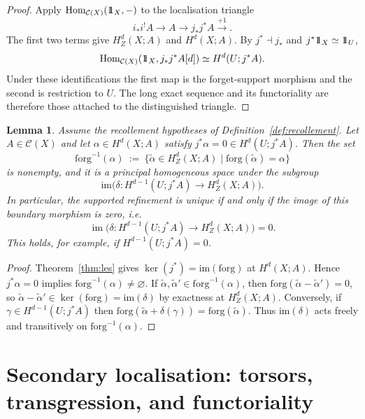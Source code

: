 \documentclass[10pt,a4paper,dvipsnames,x11names]{amsart}
\newcommand{\one}{1\hskip-3.5pt1}
\newcommand{\C}{\mathcal C}
\newcommand{\Hom}{\mathrm{Hom}}
\newcommand{\forg}{\mathrm{forg}}
\numberwithin{equation}{section}
\theoremstyle{plain}
\newtheorem{lemma}[lemma]{Lemma}
\theoremstyle{definition}
\theoremstyle{remark}
\begin{document}
\begin{proof}
Apply $\Hom_{\C(X)}(\one_X,-)$ to the localisation triangle
\[
i_*i^!A\longrightarrow A\longrightarrow j_*j^*A\xrightarrow{+1}.
\]
The first two terms give $H_Z^d(X;A)$ and $H^d(X;A)$.  By $j^*\dashv j_*$ and $j^*\one_X\simeq\one_U$,
\[
\Hom_{\C(X)}(\one_X,j_*j^*A[d])
\simeq
H^d(U;j^*A).
\]
Under these identifications the first map is the forget-support morphism and the second is restriction to $U$.  The long exact sequence and its functoriality are therefore those attached to the distinguished triangle.
\end{proof}

\begin{lemma} \label{lem:supported-torsor}
Assume the recollement hypotheses of Definition~\ref{def:recollement}. Let $A\in\C(X)$ and let $\alpha\in H^{d}(X;A)$ satisfy
$j^{*}\alpha=0\in H^{d}(U;j^{*}A)$.
Then the set
\begin{equation*}
\forg^{-1}(\alpha)\ :=\ \{\widetilde\alpha\in H_Z^{d}(X;A)\mid \forg(\widetilde\alpha)=\alpha\}
\end{equation*}
is nonempty, and it is a principal homogeneous space under the subgroup
$$\mathrm{im}\big(\delta:H^{d-1}(U;j^{*}A)\to H_Z^{d}(X;A)\big).$$
In particular, the supported refinement is unique if and only if the image of this boundary morphism is zero, i.e.
\[
\operatorname{im}
\bigl(\delta:H^{d-1}(U;j^{*}A)\to H_Z^{d}(X;A)\bigr)=0.
\]
This holds, for example, if $H^{d-1}(U;j^{*}A)=0$.
\end{lemma}

\begin{proof}
Theorem~\ref{thm:les} gives $\ker(j^{*})=\mathrm{im}(\forg)$ at $H^{d}(X;A)$. Hence $j^{*}\alpha=0$ implies $\forg^{-1}(\alpha)\neq\varnothing$.
If $\widetilde\alpha,\widetilde\alpha'\in\forg^{-1}(\alpha)$, then
$\forg(\widetilde\alpha-\widetilde\alpha')=0$, so
$\widetilde\alpha-\widetilde\alpha'\in\ker(\forg)=\mathrm{im}(\delta)$
by exactness at $H_Z^{d}(X;A)$.
Conversely, if $\gamma\in H^{d-1}(U;j^{*}A)$ then
$\forg(\widetilde\alpha+\delta(\gamma))=\forg(\widetilde\alpha)$.
Thus $\mathrm{im}(\delta)$ acts freely and transitively on $\forg^{-1}(\alpha)$.
\end{proof}

\section{Secondary localisation: torsors, transgression, and functoriality}\label{sec:UnivLoc}
\end{document}
